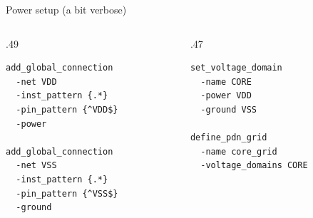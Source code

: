 \begin{frame}[fragile]{Power setup (a bit verbose)}
\begin{columns}[T,onlytextwidth]
\begin{column}{.49\textwidth}
\begin{lstlisting}[basicstyle=\ttfamily\fontsize{8}{11}\selectfont]
add_global_connection
  -net VDD
  -inst_pattern {.*}
  -pin_pattern {^VDD$}
  -power

add_global_connection
  -net VSS
  -inst_pattern {.*}
  -pin_pattern {^VSS$}
  -ground
\end{lstlisting}
\end{column}
\begin{column}{.47\textwidth}
\begin{lstlisting}[basicstyle=\ttfamily\fontsize{8}{11}\selectfont]
set_voltage_domain
  -name CORE
  -power VDD
  -ground VSS

define_pdn_grid
  -name core_grid
  -voltage_domains CORE
\end{lstlisting}
\end{column}
\end{columns}
\end{frame}

